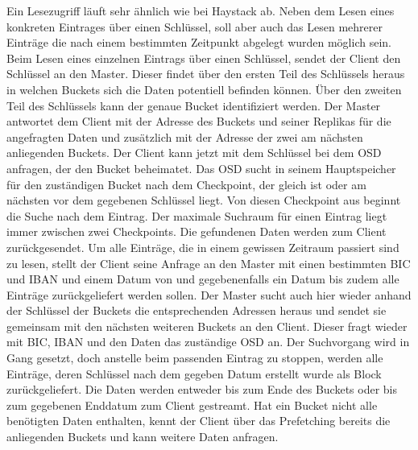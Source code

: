 \documentclass[12pt,oneside,a4paper,parskip]{scrbook}
\begin{document}
Ein Lesezugriff läuft sehr ähnlich wie bei Haystack ab. Neben dem Lesen eines konkreten Eintrages über einen Schlüssel, soll aber auch das Lesen mehrerer Einträge die nach einem bestimmten Zeitpunkt abgelegt wurden möglich sein. Beim Lesen eines einzelnen Eintrags über einen Schlüssel, sendet der Client den Schlüssel an den Master. Dieser findet über den ersten Teil des Schlüssels heraus in welchen Buckets sich die Daten potentiell befinden können. Über den zweiten Teil des Schlüssels kann der genaue Bucket identifiziert werden. Der Master antwortet dem Client mit der Adresse des Buckets und seiner Replikas für die angefragten Daten und zusätzlich mit der Adresse der zwei am nächsten anliegenden Buckets. Der Client kann jetzt mit dem Schlüssel bei dem OSD anfragen, der den Bucket beheimatet. Das OSD sucht in seinem Hauptspeicher für den zuständigen Bucket nach dem Checkpoint, der gleich ist oder am nächsten vor dem gegebenen Schlüssel liegt. Von diesen Checkpoint aus beginnt die Suche nach dem Eintrag. Der maximale Suchraum für einen Eintrag liegt immer zwischen zwei Checkpoints. Die gefundenen Daten werden zum Client zurückgesendet.  
Um alle Einträge, die in einem gewissen Zeitraum passiert sind zu lesen, stellt der Client seine Anfrage an den Master mit einen bestimmten BIC und IBAN und einem Datum von und gegebenenfalls ein Datum bis zudem alle Einträge zurückgeliefert werden sollen. Der Master sucht auch hier wieder anhand der Schlüssel der Buckets die entsprechenden Adressen heraus und sendet sie gemeinsam mit den nächsten weiteren Buckets an den Client. Dieser fragt wieder mit BIC, IBAN und den Daten das zuständige OSD an. Der Suchvorgang wird in Gang gesetzt, doch anstelle beim passenden Eintrag zu stoppen, werden alle Einträge, deren Schlüssel nach dem gegeben Datum erstellt wurde als Block zurückgeliefert. Die Daten werden entweder bis zum Ende des Buckets oder bis zum gegebenen Enddatum zum Client gestreamt.
Hat ein Bucket nicht alle benötigten Daten enthalten, kennt der Client über das Prefetching bereits die anliegenden Buckets und kann weitere Daten anfragen.
\end{document}
